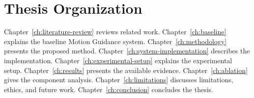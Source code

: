 \section{Thesis Organization}

Chapter~\ref{ch:literature-review} reviews related work. Chapter~\ref{ch:baseline} explains the baseline Motion Guidance system. Chapter~\ref{ch:methodology} presents the proposed method. Chapter~\ref{ch:system-implementation} describes the implementation. Chapter~\ref{ch:experimental-setup} explains the experimental setup. Chapter~\ref{ch:results} presents the available evidence. Chapter~\ref{ch:ablation} gives the component analysis. Chapter~\ref{ch:limitations} discusses limitations, ethics, and future work. Chapter~\ref{ch:conclusion} concludes the thesis.
